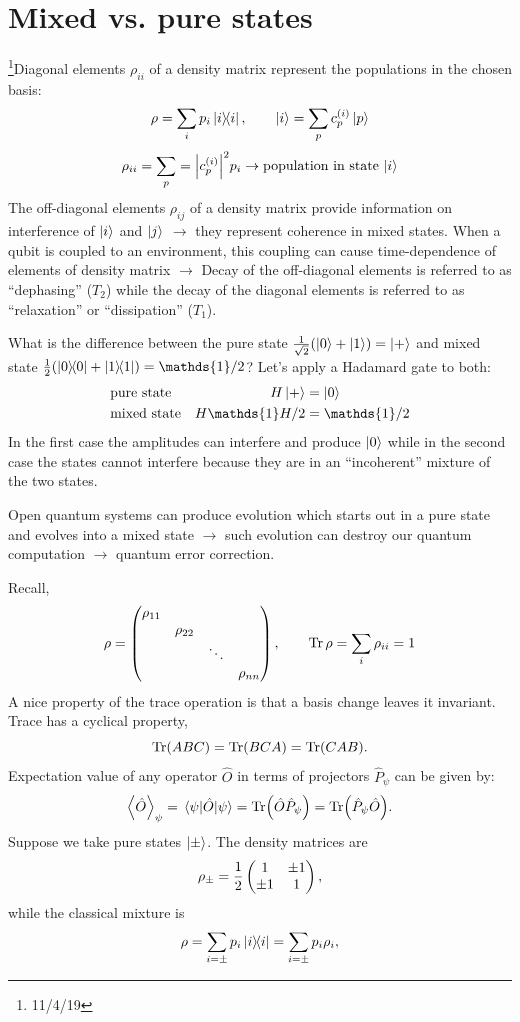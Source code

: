 \documentclass[12pt]{article}
\newcommand*\id{\mathds{1}}
\begin{document}
\section{Mixed vs. pure states}
\footnote{11/4/19}Diagonal elements $\rho_{ii}$ of a density matrix represent
the populations in the chosen basis:
\[\rho = \sum_i p_i \ketbra{i}, \qquad \ket{i} = \sum_p c_p^{(i)}\ket{p}\]
\[\rho_{ii} = \sum_p = \abs{c_p^{(i)}}^2p_i \rightarrow
\text{population in state $\ket{i}$}\]
The off-diagonal elements $\rho_{ij}$ of a density matrix provide information
on interference of $\ket{i}$ and $\ket{j}$ $\rightarrow$ they represent
coherence in mixed states. When a qubit is coupled to an environment, this
coupling can cause time-dependence of elements of density matrix $\rightarrow$
Decay of the off-diagonal elements is referred to as ``dephasing'' ($T_2$)
while the decay of the diagonal elements is referred to as ``relaxation'' or
``dissipation'' ($T_1$).

What is the difference between the pure state $\frac{1}{\sqrt{2}}(\ket{0} +
\ket{1}) = \ket{+}$ and mixed state $\frac{1}{2}(\ketbra{0} + \ketbra{1}) =
\id/2$? Let's apply a Hadamard gate to both:
\begin{align}
    &\text{pure state} & H\ket{+} &= \ket{0} \\
    &\text{mixed state} & H\id H/2 &= \id/2
\end{align}
In the first case the amplitudes can interfere and produce $\ket{0}$ while in
the second case the states cannot interfere because they are in an
``incoherent'' mixture of the two states.

Open quantum systems can produce evolution which starts out in a pure state and
evolves into a mixed state $\rightarrow$ such evolution can destroy our quantum
computation $\rightarrow$ quantum error correction.

Recall,
\[\rho = \pmqty{\dmat{\rho_{11},\rho_{22},\ddots,\rho_{nn}}}, \qquad
\Tr\rho = \sum_i \rho_{ii} = 1\]
A nice property of the trace operation is that a basis change leaves it
invariant. Trace has a cyclical property,
\[\Tr(ABC) = \Tr(BCA) = \Tr(CAB).\]
Expectation value of any operator $\hat{O}$ in terms of projectors
$\hat{P}_\psi$ can be given by:
\[\ev{\hat{O}}_\psi = \ev{\hat{O}}{\psi} = \Tr(\hat{O}\hat{P}_\psi)
=  \Tr(\hat{P}_\psi\hat{O}).\]
Suppose we take pure states $\ket{\pm}$. The density matrices are
\[\rho_\pm = \frac{1}{2}\pmqty{1&\pm1\\\pm1&1},\]
while the classical mixture is
\[\rho = \sum_{i=\pm} p_i\ketbra{i} = \sum_{i=\pm} p_i \rho_i,\]
\end{document}
